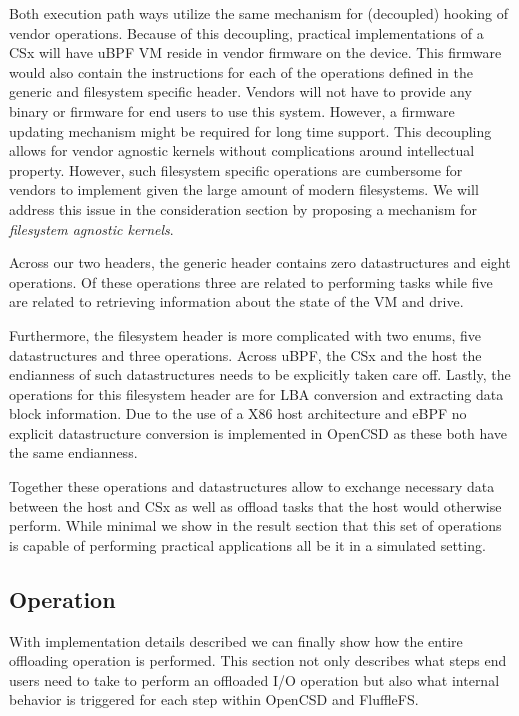 Both execution path ways utilize the same mechanism for (decoupled) hooking 
of vendor operations. Because of this decoupling, practical implementations of a
CSx will have uBPF VM reside in vendor firmware on the device. This firmware
would also contain the instructions for each of the operations defined in the
generic and filesystem specific header. Vendors will not have to provide any
binary or firmware for end users to use this system. However, a firmware
updating mechanism might be required for long time support. This decoupling
allows for vendor agnostic kernels without complications around intellectual
property. However, such filesystem specific operations are cumbersome for
vendors to implement given the large amount of modern filesystems. We will
address this issue in the consideration section by proposing a mechanism for
\textit{filesystem agnostic kernels}.

Across our two headers, the generic header contains zero datastructures and
eight operations. Of these operations three are related to performing tasks
while five are related to retrieving information about the state of the VM and
drive.

Furthermore, the filesystem header is more complicated with two enums, five
datastructures and three operations. Across uBPF, the CSx and the host the
endianness of such datastructures needs to be explicitly taken care off. Lastly,
the operations for this filesystem header are for LBA conversion and extracting
data block information. Due to the use of a X86 host architecture and eBPF no
explicit datastructure conversion is implemented in OpenCSD as these both have
the same endianness.

Together these operations and datastructures allow to exchange necessary data
between the host and CSx as well as offload tasks that the host would
otherwise perform. While minimal we show in the result section that this set of
operations is capable of performing practical applications all be it in a
simulated setting.

\subsection{Operation}

\label{operation}

With implementation details described we can finally show how the entire
offloading operation is performed. This section not only describes what steps
end users need to take to perform an offloaded I/O operation but also what
internal behavior is triggered for each step within OpenCSD and FluffleFS.

